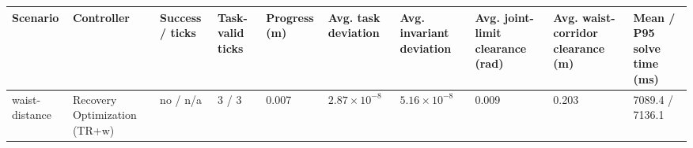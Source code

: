\begin{tabular}{llllllllll}
\toprule
Scenario & Controller & Success / ticks & Task-valid ticks & Progress (m) & Avg. task deviation & Avg. invariant deviation & Avg. joint-limit clearance (rad) & Avg. waist-corridor clearance (m) & Mean / P95 solve time (ms) \\
\midrule
waist-distance & Recovery Optimization (TR+w) & no / n/a & 3 / 3 & 0.007 & $2.87\times 10^{-8}$ & $5.16\times 10^{-8}$ & 0.009 & 0.203 & 7089.4 / 7136.1 \\
\bottomrule
\end{tabular}
